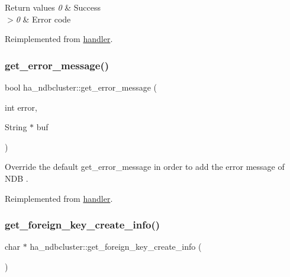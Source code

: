 \begin{DoxyRetVals}{Return values}
{\em 0} & Success \\
\hline
{\em $>$0} & Error code \\
\hline
\end{DoxyRetVals}


Reimplemented from \mbox{\hyperlink{classhandler_a886bf2fbf16de7e200e3ebc0765fb6e4}{handler}}.

\mbox{\label{classha__ndbcluster_a31a5f675ffb30d67ba91bb1cb9ec9dc8}} 
\subsubsection{\texorpdfstring{get\+\_\+error\+\_\+message()}{get\_error\_message()}}
{\footnotesize\ttfamily bool ha\+\_\+ndbcluster\+::get\+\_\+error\+\_\+message (\begin{DoxyParamCaption}\item[{int}]{error,  }\item[{String $\ast$}]{buf }\end{DoxyParamCaption})\hspace{0.3cm}{\ttfamily [virtual]}}

Override the default get\+\_\+error\+\_\+message in order to add the error message of N\+DB . 

Reimplemented from \mbox{\hyperlink{classhandler_afce8ffd064ce683481494c7503ef820c}{handler}}.

\mbox{\label{classha__ndbcluster_a8abae855bbb818c6827294eb17549365}} 
\subsubsection{\texorpdfstring{get\+\_\+foreign\+\_\+key\+\_\+create\+\_\+info()}{get\_foreign\_key\_create\_info()}}
{\footnotesize\ttfamily char $\ast$ ha\+\_\+ndbcluster\+::get\+\_\+foreign\+\_\+key\+\_\+create\+\_\+info (\begin{DoxyParamCaption}{ }\end{DoxyParamCaption})\hspace{0.3cm}{\ttfamily [virtual]}}


